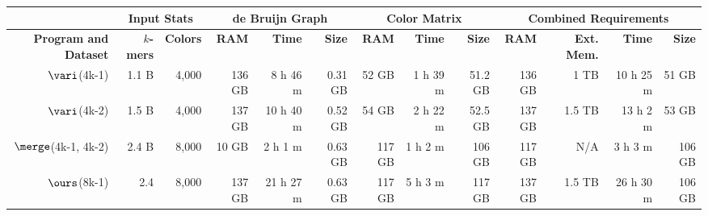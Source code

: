 \begin{table}[t]
\footnotesize
\begin{center}
\begin{tabular}{|r|r|r|r|r|r|r|r|r|r|r|r|r|}
  \hline
  &  \multicolumn{2}{|c|}{Input Stats} & \multicolumn{3}{|c|}{de Bruijn Graph } & \multicolumn{3}{|c|}{Color Matrix } & \multicolumn{4}{|c|}{Combined Requirements}\\
  \hline

\textbf{Program and Dataset} & \textbf{$k$-mers} & \textbf{Colors} & \textbf{ RAM}& \textbf{Time} & \textbf{Size} & \textbf{RAM} &   \textbf{Time} & \textbf{Size} &  \textbf{RAM}  & \textbf{Ext. Mem.}  &   \textbf{Time} & \textbf{Size} \\ 
\hline
$\vari$(4k-1)      & 1.1 B    & 4,000 &               136 GB      & 8 h 46 m  & 0.31 GB &              52 GB     & 1 h 39 m & 51.2 GB               & 136 GB & 1 TB    & 10 h 25 m & 51 GB \\
$\vari$(4k-2)      & 1.5 B    & 4,000 &              137 GB      & 10 h 40 m & 0.52 GB &              54 GB     & 2 h 22 m & 52.5 GB                &  137 GB & 1.5 TB  &  13 h  2 m & 53 GB\\
$\merge$(4k-1, 4k-2)  & 2.4 B    & 8,000 &              10 GB       & 2 h 1 m   & 0.63 GB &              117 GB    & 1 h  2 m & 106 GB               &  117 GB    &  N/A    &  3 h 3 m & 106 GB \\

\hline
$\ours$(8k-1)      & 2.4      & 8,000 &              137 GB      & 21 h 27 m & 0.63 GB &              117 GB    & 5 h 3 m  & 117 GB               &    137 GB  & 1.5 TB  & 26 h  30 m & 106 GB\\

\hline




\end{tabular}
\end{center}
\end{table}
